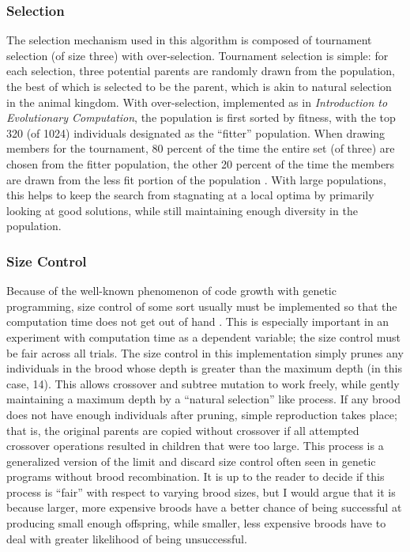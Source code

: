 \documentclass{acm_proc_article-sp}
\begin{document}
\subsubsection{Selection}
The selection mechanism used in this algorithm is composed of
tournament selection (of size three) with over-selection. Tournament
selection is simple: for each selection, three potential parents are
randomly drawn from the population, the best of which is selected to
be the parent, which is akin to natural selection in the animal
kingdom. With over-selection, implemented as in \emph{Introduction to
  Evolutionary Computation}, the population is first sorted by
fitness, with the top 320 (of 1024) individuals designated as the
``fitter'' population. When drawing members for the tournament, 80
percent of the time the entire set (of three) are chosen from the
fitter population, the other 20 percent of the time the members are
drawn from the less fit portion of the population \cite{Eiben:Evo}. With
large populations, this helps to keep the search from stagnating at a
local optima by primarily looking at good solutions, while still
maintaining enough diversity in the population.

\subsubsection{Size Control}
Because of the well-known phenomenon of code growth with genetic
programming, size control of some sort usually must be implemented so
that the computation time does not get out of hand
\cite{Soule:Growth}. This is especially important in an experiment
with computation time as a dependent variable; the size control must
be fair across all trials. The size control in this implementation
simply prunes any individuals in the brood whose depth is greater than
the maximum depth (in this case, 14). This allows crossover and
subtree mutation to work freely, while gently maintaining a maximum
depth by a ``natural selection'' like process. If any brood does not
have enough individuals after pruning, simple reproduction takes
place; that is, the original parents are copied without crossover if
all attempted crossover operations resulted in children that were too
large. This process is a generalized version of the limit and discard
size control often seen in genetic programs without brood
recombination. It is up to the reader to decide if this process is
``fair'' with respect to varying brood sizes, but I would argue that
it is because larger, more expensive broods have a better chance of
being successful at producing small enough offspring, while smaller,
less expensive broods have to deal with greater likelihood of being
unsuccessful.
\end{document}
